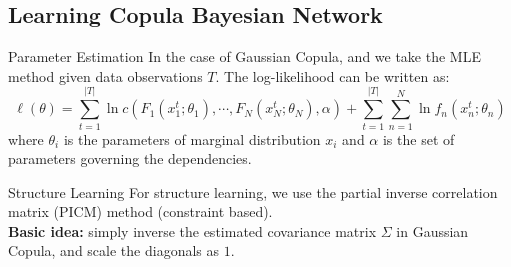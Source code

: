 \subsection{Learning Copula Bayesian Network}
\begin{frame}{Parameter Estimation}
In the case of Gaussian Copula, and we take the MLE method given data observations $T$. The log-likelihood can be written as:
\begin{equation*}
\ell(\theta) = \sum^{|T|}_{t=1}\ln c(F_1(x_1^t;\theta_1), \cdots ,F_N(x_N^t;\theta_N),\alpha)+\sum^{|T|}_{t=1}\sum^N_{n=1}\ln f_n(x^t_n;\theta_n)
\end{equation*}
where $\theta_i$ is the parameters of marginal distribution $x_i$ and $\alpha$ is the set of parameters governing the dependencies.
\end{frame}
\begin{frame}{Structure Learning}
For structure learning, we use the partial inverse correlation matrix (PICM) method (constraint based).\\
\textbf{Basic idea:} simply inverse the estimated covariance matrix $\Sigma$ in Gaussian Copula, and scale the diagonals as $1$.
\begin{small}
\end{small}\\[0.5em]
\end{frame}
